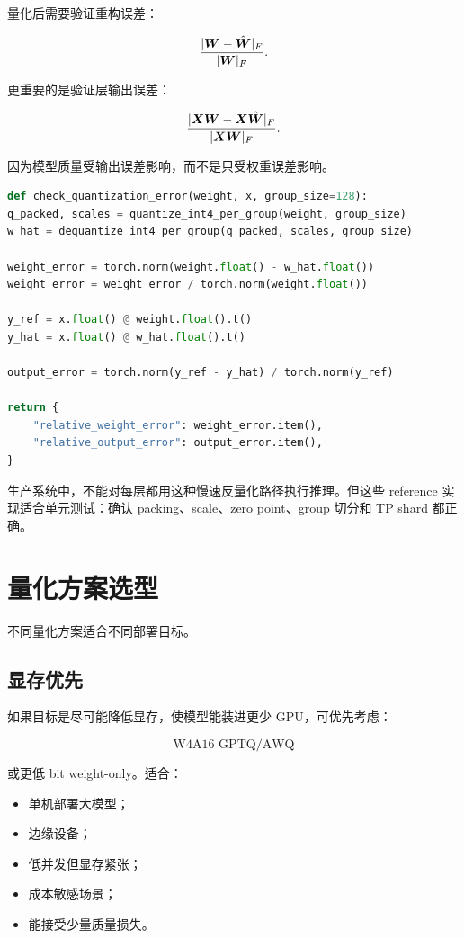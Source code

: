 量化后需要验证重构误差：

\[
\frac{|\bm{W}-\hat{\bm{W}}|_F}
{|\bm{W}|_F}.
\]

更重要的是验证层输出误差：

\[
\frac{|\bm{X}\bm{W}-\bm{X}\hat{\bm{W}}|_F}
{|\bm{X}\bm{W}|_F}.
\]

因为模型质量受输出误差影响，而不是只受权重误差影响。

\begin{lstlisting}[language=Python,caption={量化权重的重构误差与层输出误差检查},label={lst:quantization-error-check}]
def check_quantization_error(weight, x, group_size=128):
q_packed, scales = quantize_int4_per_group(weight, group_size)
w_hat = dequantize_int4_per_group(q_packed, scales, group_size)

weight_error = torch.norm(weight.float() - w_hat.float())
weight_error = weight_error / torch.norm(weight.float())

y_ref = x.float() @ weight.float().t()
y_hat = x.float() @ w_hat.float().t()

output_error = torch.norm(y_ref - y_hat) / torch.norm(y_ref)

return {
    "relative_weight_error": weight_error.item(),
    "relative_output_error": output_error.item(),
}

\end{lstlisting}

生产系统中，不能对每层都用这种慢速反量化路径执行推理。但这些 reference 实现适合单元测试：确认 packing、scale、zero point、group 切分和 TP shard 都正确。

\section{量化方案选型}
\label{sec:quantization-scheme-selection}

不同量化方案适合不同部署目标。

\subsection{显存优先}
\label{subsec:quantization-memory-first}

如果目标是尽可能降低显存，使模型能装进更少 GPU，可优先考虑：

\[
\text{W4A16 GPTQ/AWQ}
\]

或更低 bit weight-only。适合：

\begin{itemize}
\item 单机部署大模型；
\item 边缘设备；
\item 低并发但显存紧张；
\item 成本敏感场景；
\item 能接受少量质量损失。
\end{itemize}

